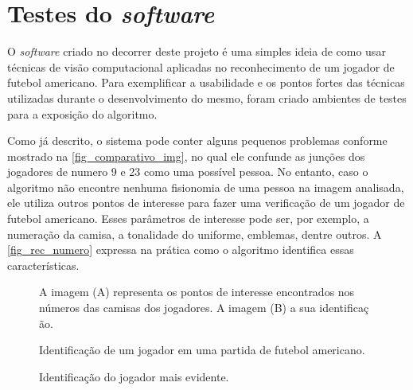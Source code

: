 \section{\textbf{Testes do \textit{software}}}
\label{testes_do_software}
O \textit{software} criado no decorrer deste projeto é uma simples ideia de como usar técnicas de visão computacional aplicadas no reconhecimento de um jogador de futebol americano. Para exemplificar a usabilidade e os pontos fortes das técnicas utilizadas durante o desenvolvimento do mesmo, foram criado ambientes de testes para a exposição do algoritmo.

Como já descrito, o sistema pode conter alguns pequenos problemas conforme mostrado na \autoref{fig_comparativo_img}, no qual ele confunde as junções dos jogadores de numero 9 e 23 como uma possível pessoa. No entanto, caso o algoritmo não encontre nenhuma fisionomia de uma pessoa na imagem analisada, ele utiliza outros pontos de interesse para fazer uma verificação de um jogador de futebol americano. Esses parâmetros de interesse pode ser, por exemplo, a numeração da camisa, a tonalidade do uniforme, emblemas, dentre outros. A \autoref{fig_rec_numero} expressa na prática como o algoritmo identifica essas características.

\begin{figure}[ht]
	\caption{\label{fig_rec_numero}A imagem (A) representa os pontos de interesse encontrados nos números das camisas dos jogadores. A imagem (B) a sua identificaç ão.}
	\begin{center}
	\end{center}
	\centering {}
\end{figure}

\begin{figure}[ht]
	\caption{\label{fig_rep_jogador_em_campo}Identificação de um jogador em uma partida de futebol americano.}
	\begin{center}
	\end{center}
	\centering {}
\end{figure}

\begin{figure}[ht]
	\caption{\label{fig_rep_jogador_mais_evidente}Identificação do jogador mais evidente.}
	\begin{center}
	\end{center}
	\centering {}
\end{figure}

